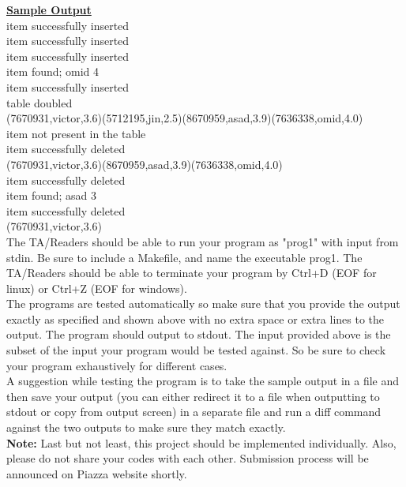 \documentclass[times, 12pt]{article}
\begin{document}
\noindent\underline{\textbf{Sample Output}}\\
item successfully inserted\\
item successfully inserted\\
item successfully inserted\\
item found; omid 4\\
item successfully inserted\\
table doubled\\
(7670931,victor,3.6)(5712195,jin,2.5)(8670959,asad,3.9)(7636338,omid,4.0)\\
item not present in the table\\
item successfully deleted\\
(7670931,victor,3.6)(8670959,asad,3.9)(7636338,omid,4.0)\\
item successfully deleted\\
item found; asad 3\\
item successfully deleted\\
(7670931,victor,3.6)\\

The TA/Readers should be able to run your program as "prog1" with input from stdin. Be sure to include a Makefile, and name the executable prog1. The TA/Readers should be able to terminate your program by Ctrl+D (EOF for linux) or Ctrl+Z (EOF for windows).\\

The programs are tested automatically so make sure that you provide the output exactly as specified and shown above with no extra space or extra lines to the output. The program should output to stdout. The input provided above is the subset of the input your program would be
tested against. So be sure to check your program exhaustively for different cases.\\

A suggestion while testing the program is to take the sample output in a file and then save your output (you can either redirect it to a file when outputting to stdout or copy
from output screen) in a separate file and run a diff command against the two outputs to make sure they match exactly.\\

\textbf{Note:} Last but not least, this project should be implemented individually. Also, please do not share your codes with each other. Submission process will be announced on Piazza website shortly.

\end{document}

